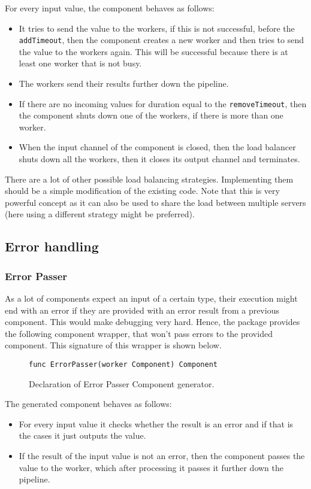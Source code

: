 \documentclass[12pt,a4paper]{article}
\begin{document}
For every input value, the component behaves as follows:
\begin{itemize}
	\item It tries to send the value to the workers, if this is not successful, 
		  before the \texttt{addTimeout}, then the component creates a new worker and then
		  tries to send the value to the workers again. This will be successful because
		  there is at least one worker that is not busy.
	\item The workers send their results further down the pipeline.
	\item If there are no incoming values for duration equal to the \texttt{removeTimeout},
          then the component shuts down one of the workers, if there is more than one worker.
	\item When the input channel of the component is closed, then the load balancer shuts down all
		  the workers, then it closes its output channel and terminates.
\end{itemize}
There are a lot of other possible load balancing strategies. 
Implementing them should be a simple modification of the existing code.
Note that this is very powerful concept as it can also be used to share
the load between multiple servers (here using a different strategy might be 
preferred).

\subsection{Error handling}
\subsubsection{Error Passer}
As a lot of components expect an input of a certain type, their execution
might end with an error if they are provided with an error result from
a previous component. This would make debugging very hard. Hence, the 
package provides the following component wrapper, that won't pass errors
to the provided component. This signature of this wrapper is shown below.
\begin{figure}[h]
\centering
\begin{lstlisting}
func ErrorPasser(worker Component) Component
\end{lstlisting}
\caption[scale=1.0]{Declaration of Error Passer Component generator.}
\label{fig:ErrorPasser}
\end{figure}

The generated component behaves as follows:
\begin{itemize}
	\item For every input value it checks whether the result is an error
		  and if that is the cases it just outputs the value.
	\item If the result of the input value is not an error, then the component
		  passes the value to the worker, which after processing it passes 
		  it further down the pipeline.
\end{itemize}
\end{document}
